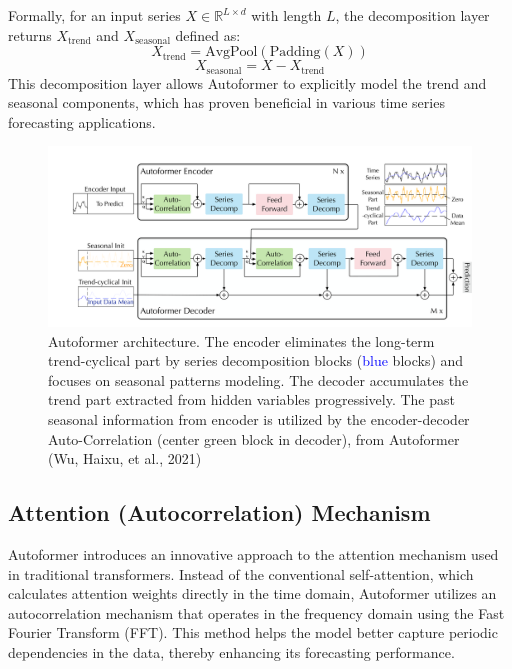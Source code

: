 Formally, for an input series \( X \in \mathbb{R}^{L \times d} \) with length \( L \), the decomposition layer returns \( X_{\text{trend}} \) and \( X_{\text{seasonal}} \) defined as:
\[
X_{\text{trend}} = \text{AvgPool}(\text{Padding}(X))
\]
\[
X_{\text{seasonal}} = X - X_{\text{trend}}
\]
This decomposition layer allows Autoformer to explicitly model the trend and seasonal components, which has proven beneficial in various time series forecasting applications.

\begin{figure}[htbp]
    \centering
    \includegraphics[width=15cm]{3_ChapterTranformerVariants/figuras/AutoformerArchitecture.pdf}
    \caption{Autoformer architecture. The encoder eliminates the long-term trend-cyclical part by series decomposition blocks (\textcolor{blue}{blue} blocks) and focuses on seasonal patterns modeling. The decoder accumulates the trend part extracted from hidden variables progressively. The past seasonal information from encoder is utilized by the encoder-decoder Auto-Correlation (center \textcolor[rgb]{0.15,0.7,0.15}{green} block in decoder), from Autoformer (Wu, Haixu, et al., 2021)\cite{wu2022autoformerdecompositiontransformersautocorrelation}}
    \end{figure}



\subsection{Attention (Autocorrelation) Mechanism}
Autoformer introduces an innovative approach to the attention mechanism used in traditional transformers. Instead of the conventional self-attention, which calculates attention weights directly in the time domain, Autoformer utilizes an autocorrelation mechanism that operates in the frequency domain using the Fast Fourier Transform (FFT). This method helps the model better capture periodic dependencies in the data, thereby enhancing its forecasting performance.

